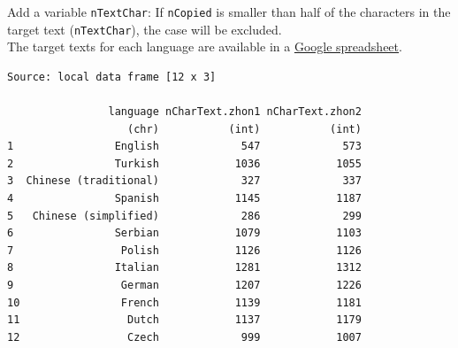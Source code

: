 \documentclass[]{article}
\newenvironment{Shaded}{\begin{snugshade}}{\end{snugshade}}
\newcommand{\KeywordTok}[1]{\textcolor[rgb]{0.94,0.87,0.69}{{#1}}}
\newcommand{\DataTypeTok}[1]{\textcolor[rgb]{0.87,0.87,0.75}{{#1}}}
\newcommand{\FloatTok}[1]{\textcolor[rgb]{0.75,0.75,0.82}{{#1}}}
\newcommand{\StringTok}[1]{\textcolor[rgb]{0.80,0.58,0.58}{{#1}}}
\newcommand{\NormalTok}[1]{\textcolor[rgb]{0.80,0.80,0.80}{{#1}}}
\begin{document}
\begin{Shaded}
\end{Shaded}

Add a variable \texttt{nTextChar}: If \texttt{nCopied} is smaller than
half of the characters in the target text (\texttt{nTextChar}), the case
will be excluded.\\The target texts for each language are available in a
\href{https://docs.google.com/spreadsheets/d/1J9I1JVTQqCrC7x5gz3TzA7sUCvjKJGfz0nh8EgfVAVs/edit?usp=sharing}{Google
spreadsheet}.

\begin{Shaded}
\end{Shaded}

\begin{verbatim}
Source: local data frame [12 x 3]

                language nCharText.zhon1 nCharText.zhon2
                   (chr)           (int)           (int)
1                English             547             573
2                Turkish            1036            1055
3  Chinese (traditional)             327             337
4                Spanish            1145            1187
5   Chinese (simplified)             286             299
6                Serbian            1079            1103
7                 Polish            1126            1126
8                Italian            1281            1312
9                 German            1207            1226
10                French            1139            1181
11                 Dutch            1137            1179
12                 Czech             999            1007
\end{verbatim}
\end{document}
